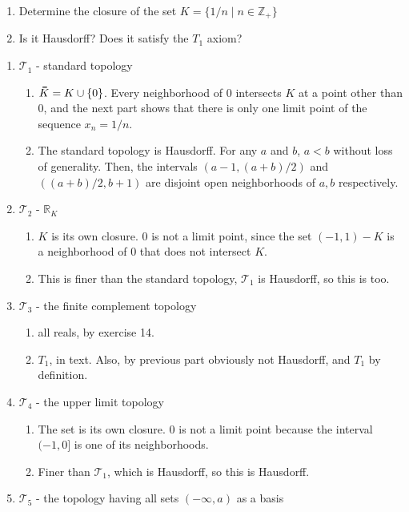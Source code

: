 \documentclass[12pt,letterpaper]{article}
\newcommand{\Wlog}{without loss of generality}
\newcommand\thickbar[1]{\accentset{\rule{.4em}{.8pt}}{#1}}
\let\bar\thickbar
\newcommand{\T}{\ensuremath{\mathcal{T}}}
\begin{document}
\begin{enumerate}
  \begin{enumerate}
    \item Determine the closure of the set $K=\{1/n\;|\;n\in\mathbb{Z}_+\}$
    \item Is it Hausdorff? Does it satisfy the $T_1$ axiom?
  \end{enumerate}
  \begin{enumerate}[label=\roman*)]
    \item $\T_1$ - standard topology
    \begin{enumerate}[label=(\alph*)]
      \item $\bar{K}=K\cup \{0\}$. Every neighborhood of 0 intersects $K$ at a point other than 0, and the next part shows that there is only one limit point of the sequence $x_n=1/n$.
      \item The standard topology is Hausdorff. For any $a$ and $b$, $a<b$ \Wlog . Then, the intervals $(a-1, (a+b)/2)$ and $((a+b)/2, b+1)$ are disjoint open neighborhoods of $a,b$ respectively.
    \end{enumerate}
    \item $\T_2$ - $\mathbb{R}_K$
    \begin{enumerate}[label=(\alph*)]
      \item $K$ is its own closure. 0 is not a limit point, since the set $(-1, 1) - K$ is a neighborhood of 0 that does not intersect $K$.
      \item This is finer than the standard topology, $\T_1$ is Hausdorff, so this is too.
    \end{enumerate}
    \item $\T_3$ - the finite complement topology
    \begin{enumerate}[label=(\alph*)]
      \item all reals, by exercise 14.
      \item $T_1$, in text. Also, by previous part obviously not Hausdorff, and $T_1$ by definition.
    \end{enumerate}
    \item $\T_4$ - the upper limit topology
    \begin{enumerate}[label=(\alph*)]
      \item The set is its own closure. 0 is not a limit point because the interval $(-1,0]$ is one of its neighborhoods.
      \item Finer than $\T_1$, which is Hausdorff, so this is Hausdorff.
    \end{enumerate}
    \item $\T_5$ - the topology having all sets $(-\infty, a)$ as a basis

\end{enumerate}
\end{enumerate}
\end{document}
